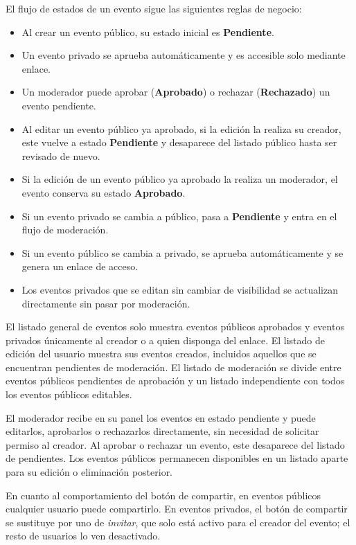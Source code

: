 El flujo de estados de un evento sigue las siguientes reglas de negocio:

\begin{itemize}
    \item Al crear un evento público, su estado inicial es \textbf{Pendiente}.
    \item Un evento privado se aprueba automáticamente y es accesible solo mediante enlace.
    \item Un moderador puede aprobar (\textbf{Aprobado}) o rechazar (\textbf{Rechazado}) un evento pendiente.
    \item Al editar un evento público ya aprobado, si la edición la realiza su creador, este vuelve a estado \textbf{Pendiente} y desaparece del listado público hasta ser revisado de nuevo.
    \item Si la edición de un evento público ya aprobado la realiza un moderador, el evento conserva su estado \textbf{Aprobado}.
    \item Si un evento privado se cambia a público, pasa a \textbf{Pendiente} y entra en el flujo de moderación.
    \item Si un evento público se cambia a privado, se aprueba automáticamente y se genera un enlace de acceso.
    \item Los eventos privados que se editan sin cambiar de visibilidad se actualizan directamente sin pasar por moderación.
\end{itemize}

El listado general de eventos solo muestra eventos públicos aprobados y eventos privados únicamente al creador o a quien disponga del enlace. El listado de edición del usuario muestra sus eventos creados, incluidos aquellos que se encuentran pendientes de moderación. El listado de moderación se divide entre eventos públicos pendientes de aprobación y un listado independiente con todos los eventos públicos editables.

El moderador recibe en su panel los eventos en estado pendiente y puede editarlos, aprobarlos o rechazarlos directamente, sin necesidad de solicitar permiso al creador. Al aprobar o rechazar un evento, este desaparece del listado de pendientes. Los eventos públicos permanecen disponibles en un listado aparte para su edición o eliminación posterior.

En cuanto al comportamiento del botón de compartir, en eventos públicos cualquier usuario puede compartirlo. En eventos privados, el botón de compartir se sustituye por uno de \textit{invitar}, que solo está activo para el creador del evento; el resto de usuarios lo ven desactivado.


